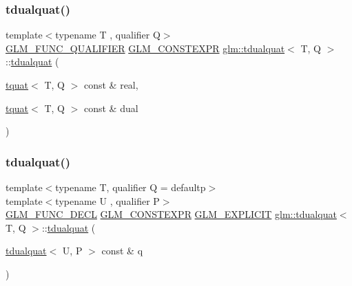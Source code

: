 \mbox{\label{structglm_1_1tdualquat_ab86d3cf3f902945d1d774505b32f9f56}} 
\subsubsection{\texorpdfstring{tdualquat()}{tdualquat()}\hspace{0.1cm}{\footnotesize\ttfamily [6/11]}}
{\footnotesize\ttfamily template$<$typename T , qualifier Q$>$ \\
\mbox{\hyperlink{setup_8hpp_a33fdea6f91c5f834105f7415e2a64407}{G\+L\+M\+\_\+\+F\+U\+N\+C\+\_\+\+Q\+U\+A\+L\+I\+F\+I\+ER}} \mbox{\hyperlink{setup_8hpp_a08b807947b47031d3a511f03f89645ad}{G\+L\+M\+\_\+\+C\+O\+N\+S\+T\+E\+X\+PR}} \mbox{\hyperlink{structglm_1_1tdualquat}{glm\+::tdualquat}}$<$ T, Q $>$\+::\mbox{\hyperlink{structglm_1_1tdualquat}{tdualquat}} (\begin{DoxyParamCaption}\item[{\mbox{\hyperlink{structglm_1_1tquat}{tquat}}$<$ T, Q $>$ const \&}]{real,  }\item[{\mbox{\hyperlink{structglm_1_1tquat}{tquat}}$<$ T, Q $>$ const \&}]{dual }\end{DoxyParamCaption})}

\mbox{\label{structglm_1_1tdualquat_a1fbee84d447e37ac7542412dab82cbcf}} 
\subsubsection{\texorpdfstring{tdualquat()}{tdualquat()}\hspace{0.1cm}{\footnotesize\ttfamily [7/11]}}
{\footnotesize\ttfamily template$<$typename T, qualifier Q = defaultp$>$ \\
template$<$typename U , qualifier P$>$ \\
\mbox{\hyperlink{setup_8hpp_ab2d052de21a70539923e9bcbf6e83a51}{G\+L\+M\+\_\+\+F\+U\+N\+C\+\_\+\+D\+E\+CL}} \mbox{\hyperlink{setup_8hpp_a08b807947b47031d3a511f03f89645ad}{G\+L\+M\+\_\+\+C\+O\+N\+S\+T\+E\+X\+PR}} \mbox{\hyperlink{setup_8hpp_a6c74f5a5e7b134ab69023ff9a30d4d5d}{G\+L\+M\+\_\+\+E\+X\+P\+L\+I\+C\+IT}} \mbox{\hyperlink{structglm_1_1tdualquat}{glm\+::tdualquat}}$<$ T, Q $>$\+::\mbox{\hyperlink{structglm_1_1tdualquat}{tdualquat}} (\begin{DoxyParamCaption}\item[{\mbox{\hyperlink{structglm_1_1tdualquat}{tdualquat}}$<$ U, P $>$ const \&}]{q }\end{DoxyParamCaption})}

